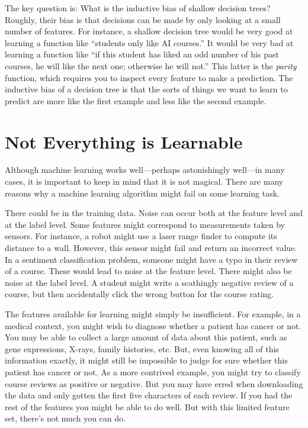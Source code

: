 The key question is: What is the inductive bias of shallow decision
trees?  Roughly, their bias is that decisions can be made by only
looking at a small number of features.  For instance, a shallow
decision tree would be very good at learning a function like ``students
only like AI courses.''  It would be very bad at learning a function
like ``if this student has liked an odd number of his past courses, he
will like the next one; otherwise he will not.''  This latter is the
\emph{parity} function, which requires you to inspect every feature to
make a prediction.  The inductive bias of a decision tree is that the
sorts of things we want to learn to predict are more like the first
example and less like the second example.


\section{Not Everything is Learnable}

Although machine learning works well---perhaps astonishingly well---in
many cases, it is important to keep in mind that it is not magical.
There are many reasons why a machine learning algorithm might fail on
some learning task.

There could be  in the training data.  Noise can occur
both at the feature level and at the label level.  Some features might
correspond to measurements taken by sensors.  For instance, a robot
might use a laser range finder to compute its distance to a wall.
However, this sensor might fail and return an incorrect value.  In a
sentiment classification problem, someone might have a typo in their
review of a course.  These would lead to noise at the feature level.
There might also be noise at the label level.  A student might write a
scathingly negative review of a course, but then accidentally click
the wrong button for the course rating.

The features available for learning might simply be insufficient.  For
example, in a medical context, you might wish to diagnose whether a
patient has cancer or not.  You may be able to collect a large amount
of data about this patient, such as gene expressions, X-rays, family
histories, etc.  But, even knowing all of this information exactly, it
might still be impossible to judge for sure whether this patient has
cancer or not.  As a more contrived example, you might try to classify
course reviews as positive or negative.  But you may have erred when
downloading the data and only gotten the first five characters of each
review.  If you had the rest of the features you might be able to do
well.  But with this limited feature set, there's not much you can do.


